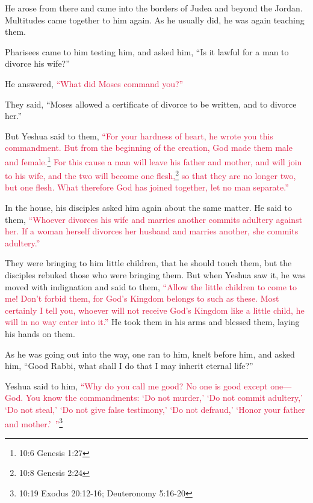 \mychapter{} \myverse*{}He arose from there and came into the borders of Judea and beyond
the Jordan. Multitudes came together to him again. As he usually did, he was again teaching them.

\myverse{}Pharisees came to him testing him, and asked him, “Is it lawful
for a man to divorce his wife?”

\myverse{}He answered,
\textcolor{crimson}{“What did Moses command you?”}

\myverse{}They said, “Moses allowed a certificate of divorce to be written,
and to divorce her.”

\myverse{}But Yeshua said to them,
\textcolor{crimson}{“For your hardness of heart, he wrote you this commandment.
}
\myverse{}\textcolor{crimson}{But from the beginning of the creation, God made them male and female.}\footnote{10:6 Genesis 1:27}
\myverse{}\textcolor{crimson}{For this cause a man will leave his father and mother, and will join to
	his wife,
}
\myverse{}\textcolor{crimson}{and the two will become one flesh,}\footnote{10:8 Genesis 2:24}
\textcolor{crimson}{so that they are no longer two, but one flesh.
}
\myverse{}\textcolor{crimson}{What therefore God has joined together, let no man separate.”
}

\myverse{}In the house, his disciples asked him again about the same matter.
\myverse{}He said to them,
\textcolor{crimson}{“Whoever divorces his wife and marries another commits adultery against her.
}
\myverse{}\textcolor{crimson}{If a woman herself divorces her husband and marries another, she commits
	adultery.”}

\myverse{}They were bringing to him little children, that he should touch
them, but the disciples rebuked those who were bringing them.
\myverse{}But when Yeshua saw it, he was moved with indignation and said to them,
\textcolor{crimson}{“Allow the little children to come to me! Don’t forbid them, for God’s Kingdom belongs to such as
	these.
}
\myverse{}\textcolor{crimson}{Most certainly I tell you, whoever will not receive God’s Kingdom like
	a little child, he will in no way enter into it.”}
\myverse{}He took them in his arms and blessed them, laying his hands on them.

\myverse{}As he was going out into the way, one ran to him, knelt before
him, and asked him, “Good Rabbi, what shall I do that I may inherit eternal life?”

\myverse{}Yeshua said to him,
\textcolor{crimson}{“Why do you call me good? No one is good except one—God.
}
\myverse{}\textcolor{crimson}{You know the commandments: ‘Do not murder,’ ‘Do not commit adultery,’
	‘Do not steal,’ ‘Do not give false testimony,’ ‘Do not defraud,’ ‘Honor your father and mother.’ ”}\footnote{10:19 Exodus 20:12-16;
	Deuteronomy 5:16-20
}

